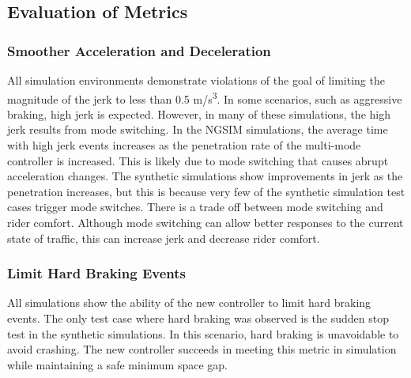 \documentclass[conference]{IEEEtran}
\begin{document}
\subsection{Evaluation of Metrics}

\subsubsection{Smoother Acceleration and Deceleration}




All simulation environments demonstrate violations of the goal of limiting the magnitude of the jerk to less than 0.5 m/s\textsuperscript{3}. In some scenarios, such as aggressive braking, high jerk is expected. However, in many of these simulations, the high jerk results from mode switching. In the NGSIM simulations, the average time with high jerk events increases as the penetration rate of the multi-mode controller is increased. This is likely due to mode switching that causes abrupt acceleration changes. The synthetic simulations show improvements in jerk as the penetration increases, but this is because very few of the synthetic simulation test cases trigger mode switches. There is a trade off between mode switching and rider comfort. Although mode switching can allow better responses to the current state of traffic, this can increase jerk and decrease rider comfort.

\subsubsection{Limit Hard Braking Events}

All simulations show the ability of the new controller to limit hard braking events. The only test case where hard braking was observed is the sudden stop test in the synthetic simulations. In this scenario, hard braking is unavoidable to avoid crashing. The new controller succeeds in meeting this metric in simulation while maintaining a safe minimum space gap.
\end{document}
